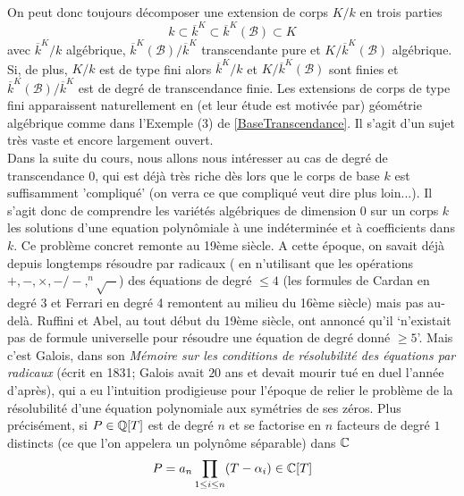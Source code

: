  On peut donc toujours décomposer une extension de corps $K/k$ en trois parties
$$k\subset \overline{k}^K\subset \overline{k}^K(\mathcal{B})\subset K$$
avec $ \overline{k}^K/k$ algébrique, $ \overline{k}^K(\mathcal{B})/ \overline{k}^K$ transcendante pure et $K/ \overline{k}^K(\mathcal{B})$ algébrique. Si, de plus, $K/k$ est de type fini alors $ \overline{k}^K/k$   et $K/ \overline{k}^K(\mathcal{B})$ sont finies et   $ \overline{k}^K(\mathcal{B})/ \overline{k}^K$ est de degré de transcendance finie. Les extensions de corps de type fini apparaissent naturellement en (et leur étude est motivée par) géométrie algébrique comme dans l'Exemple (3) de \ref{BaseTranscendance}. Il s'agit d'un sujet très vaste et encore largement ouvert. \\

 Dans la suite du cours, nous allons nous intéresser au cas de degré de transcendance $0$, qui est déjà très riche  dès lors que le corps de base $k$ est suffisamment 'compliqué' (on verra   ce que compliqué veut dire plus loin...). Il s'agit donc de comprendre les variétés algébriques de dimension $0$ sur un corps $k$ \ie{} les solutions d'une equation polynômiale à une indéterminée et à coefficients dans $k$. Ce problème concret remonte au 19ème siècle. A cette époque, on savait déjà depuis longtemps résoudre par radicaux (\ie{} en n'utilisant que les opérations $+,-,\times, -/-,^n\sqrt{-}$) des équations de degré $\leq 4$ (les formules de Cardan en degré $3$ et Ferrari en degré 4 remontent au milieu du 16ème siècle) mais pas au-delà.  Ruffini et Abel, au tout début du 19ème siècle, ont annoncé  qu'il `n'existait pas de formule universelle pour résoudre une équation de degré donné $\geq 5$'. Mais c'est Galois, dans son \textit{Mémoire sur les conditions de résolubilité des équations par radicaux} (écrit en 1831; Galois avait $20$ ans et devait mourir tué en duel l'année d'après), qui a eu l'intuition prodigieuse pour l'époque de relier le problème de la résolubilité d'une équation polynomiale aux symétries de ses zéros. Plus précisément, si $P\in \mathbb{Q}[T]$ est de degré $n$ et se factorise en $n$ facteurs de degré $1$ distincts  (ce que l'on appelera un polynôme séparable) dans $\mathbb{C}$
$$P=a_n\prod_{1\leq i\leq n}(T-\alpha_i)\in \mathbb{C}[T]$$
